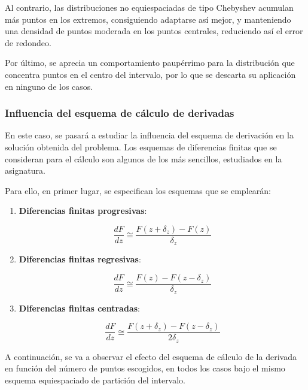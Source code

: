 Al contrario, las distribuciones no equiespaciadas de tipo Chebyshev acumulan más puntos en los extremos, consiguiendo adaptarse así mejor, y manteniendo una densidad de puntos moderada en los puntos centrales, reduciendo así el error de redondeo. 

Por último, se aprecia un comportamiento paupérrimo para la distribución que concentra puntos en el centro del intervalo, por lo que se descarta su aplicación en ninguno de los casos.

\subsubsection{Influencia del esquema de cálculo de derivadas}

En este caso, se pasará a estudiar la influencia del esquema de derivación en la solución obtenida del problema. Los esquemas de diferencias finitas que se consideran para el cálculo son algunos de los más sencillos, estudiados en la asignatura.

Para ello, en primer lugar, se especifican los esquemas que se emplearán:

\begin{enumerate}
    \item \textbf{Diferencias finitas progresivas}: 
    
    \begin{equation}
        \frac{d F}{d z} \cong \frac{F(z + \delta_z) - F(z)}{\delta_z}
    \end{equation}

    \item \textbf{Diferencias finitas regresivas}: 
    
    \begin{equation}
        \frac{d F}{d z} \cong \frac{F(z) - F(z - \delta_z)}{\delta_z}
    \end{equation}

    \item \textbf{Diferencias finitas centradas}: 
    
    \begin{equation}
        \frac{d F}{d z} \cong \frac{F(z + \delta_z) - F(z - \delta_z)}{2 \delta_z}
    \end{equation}
\end{enumerate}

A continuación, se va a observar el efecto del esquema de cálculo de la derivada en función del número de puntos escogidos, en todos los casos bajo el mismo esquema equiespaciado de partición del intervalo. 

